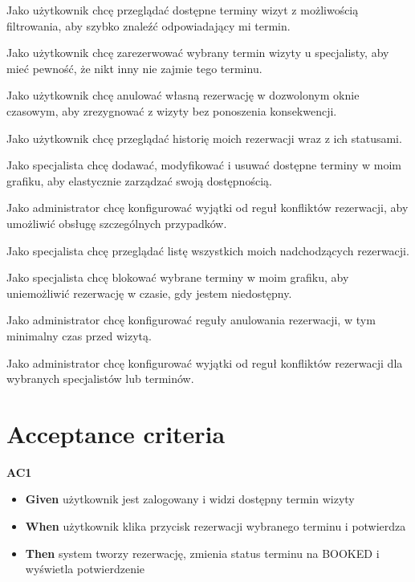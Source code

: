 \documentclass[12pt,a4paper]{article}
\begin{document}
\begin{description}[leftmargin=1.8cm, labelwidth=1.3cm, labelsep=0.5cm, style=nextline]
  \item[US1] Jako użytkownik chcę przeglądać dostępne terminy wizyt z możliwością filtrowania, aby szybko znaleźć odpowiadający mi termin.
  \item[US2] Jako użytkownik chcę zarezerwować wybrany termin wizyty u specjalisty, aby mieć pewność, że nikt inny nie zajmie tego terminu.
  \item[US3] Jako użytkownik chcę anulować własną rezerwację w dozwolonym oknie czasowym, aby zrezygnować z wizyty bez ponoszenia konsekwencji.
  \item[US4] Jako użytkownik chcę przeglądać historię moich rezerwacji wraz z ich statusami.
  \item[US5] Jako specjalista chcę dodawać, modyfikować i usuwać dostępne terminy w moim grafiku, aby elastycznie zarządzać swoją dostępnością.
  \item[US6] Jako administrator chcę konfigurować wyjątki od reguł konfliktów rezerwacji, aby umożliwić obsługę szczególnych przypadków.
  \item[US7] Jako specjalista chcę przeglądać listę wszystkich moich nadchodzących rezerwacji.
  \item[US8] Jako specjalista chcę blokować wybrane terminy w moim grafiku, aby uniemożliwić rezerwację w czasie, gdy jestem niedostępny.
  \item[US9] Jako administrator chcę konfigurować reguły anulowania rezerwacji, w tym minimalny czas przed wizytą.
  \item[US10] Jako administrator chcę konfigurować wyjątki od reguł konfliktów rezerwacji dla wybranych specjalistów lub terminów.
\end{description}

\section{Acceptance criteria}

\textbf{AC1}
\begin{itemize}[itemsep=2pt]
  \item \textbf{Given} użytkownik jest zalogowany i widzi dostępny termin wizyty
  \item \textbf{When} użytkownik klika przycisk rezerwacji wybranego terminu i potwierdza
  \item \textbf{Then} system tworzy rezerwację, zmienia status terminu na BOOKED i wyświetla potwierdzenie
\end{itemize}
\end{document}
